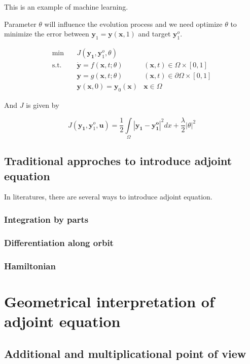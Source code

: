 \documentclass{article}
\begin{document}
This is an example of machine learning.

Parameter $\theta$ will influence the evolution process and we need optimize $\theta$ to minimize the error between $ \mathbf{y}_1 = \mathbf{y}(\mathbf{x}, 1)$ and target $ \mathbf{y}_1^o $.

$$
\begin{array}{rcll}
\min &~& J(\mathbf{y_1}, \mathbf{y}_1^o, \theta) & \\
\mathrm{s.t.} &~& \dot{\mathbf{y}} = f(\mathbf{x}, t; \theta) & (\mathbf{x}, t) \in \Omega \times [0, 1] \\
&~& \mathbf{y} = g(\mathbf{x}, t; \theta) & (\mathbf{x}, t) \in \partial \Omega \times [0, 1] \\
&~& \mathbf{y}(\mathbf{x}, 0) = \mathbf{y}_0(\mathbf{x}) & \mathbf{x} \in \Omega
\end{array}
$$

And $ J $ is given by

$$
J(\mathbf{y_1}, \mathbf{y}_1^o, \mathbf{u}) = \frac{1}{2} \int\limits_{\Omega}|\mathbf{y_1} - \mathbf{y_1^o}|^2dx + \frac{\lambda}{2} |\theta|^2
$$

\subsection{Traditional approches to introduce adjoint equation}

In literatures, there are several ways to introduce adjoint equation.

\subsubsection{Integration by parts}

\subsubsection{Differentiation along orbit}

\subsubsection{Hamiltonian}

\section{Geometrical interpretation of adjoint equation}

\subsection{Additional and multiplicational point of view}
\end{document}
